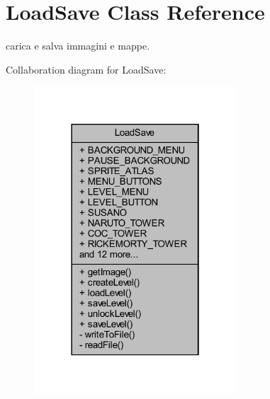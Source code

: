 \hypertarget{classhelpz_1_1_load_save}{}\section{Load\+Save Class Reference}
\label{classhelpz_1_1_load_save}


carica e salva immagini e mappe.  




Collaboration diagram for Load\+Save\+:\nopagebreak
\begin{figure}[H]
\begin{center}
\leavevmode
\includegraphics[width=214pt]{classhelpz_1_1_load_save__coll__graph}
\end{center}
\end{figure}
